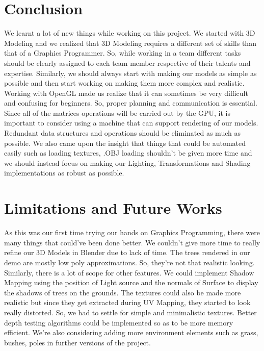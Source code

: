 \documentclass{report}
\begin{document}
\section{Conclusion}
    We learnt a lot of new things while working on this project. We started with 3D Modeling and we realized 
    that 3D Modeling requires a different set of skills than that of a Graphics Programmer. So, while working 
    in a team different tasks should be clearly assigned to each team member respective of their talents and 
    expertise. Similarly, we should always start with making our models as simple as possible and then start 
    working on making them more complex and realistic. Working with OpenGL made us realize that it can sometimes 
    be very difficult and confusing for beginners. So, proper planning and communication is essential. Since all 
    of the matrices operations will be carried out by the GPU, it is important to consider using a machine 
    that can support rendering of our models. Redundant data structures and operations should be eliminated 
    as much as possible. We also came upon the insight that things that could be automated easily such as loading 
    textures, .OBJ loading shouldn't be given more time and we should instead focus on making our Lighting, Transformations and 
    Shading implementations as robust as possible.
\section{Limitations and Future Works}
    As this was our first time trying our hands on Graphics Programming, there were many things that could've 
    been done better. We couldn't give more time to really refine our 3D Models in Blender due to lack of time. 
    The trees rendered in our demo are mostly low poly approximations. So, they're not that realistic looking. 
    Similarly, there is a lot of scope for other features. We could implement Shadow Mapping using the position 
    of Light source and the normals of Surface to display the shadows of trees on the grounds. The textures could 
    also be made more realistic but since they get extracted during UV Mapping, they started to look really 
    distorted. So, we had to settle for simple and minimalistic textures. Better depth testing algorithms could 
    be implemented so as to be more memory efficient. We're also considering adding more environment elements 
    such as grass, bushes, poles in further versions of the project.

 

\end{document}
